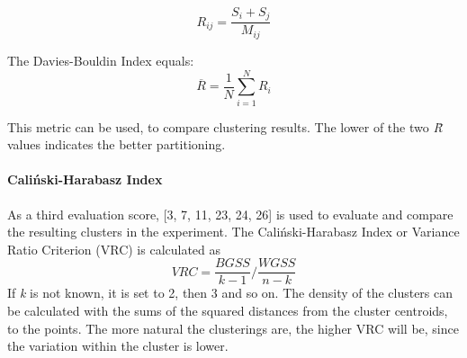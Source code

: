 \[
  R_{ij} = \frac{S_i + S_j}{M_{ij}}  
\]

The Davies-Bouldin Index equals:
\[
\overline{R} = \frac{1}{N}\sum_{i=1}^{N}R_i
\]

This metric can be used, to compare clustering results. The lower of the two \textit{\=R} values indicates the better partitioning.

\paragraph{Caliński-Harabasz Index}
As a third evaluation score, \textcite{calinskiHarabasz}[3, 7, 11, 23, 24, 26] is used to evaluate and compare the resulting clusters in the experiment. 
The Caliński-Harabasz Index or Variance Ratio Criterion (VRC) is calculated as 
\[
VRC = \frac{BGSS}{k-1}/\frac{WGSS}{n-k}
\]
If \textit{k} is not known, it is set to 2, then 3 and so on. The density of the clusters can be calculated with the sums of the squared distances from the cluster centroids, to the points. The more natural the clusterings are, the higher VRC will be, since the variation within the cluster is lower.





